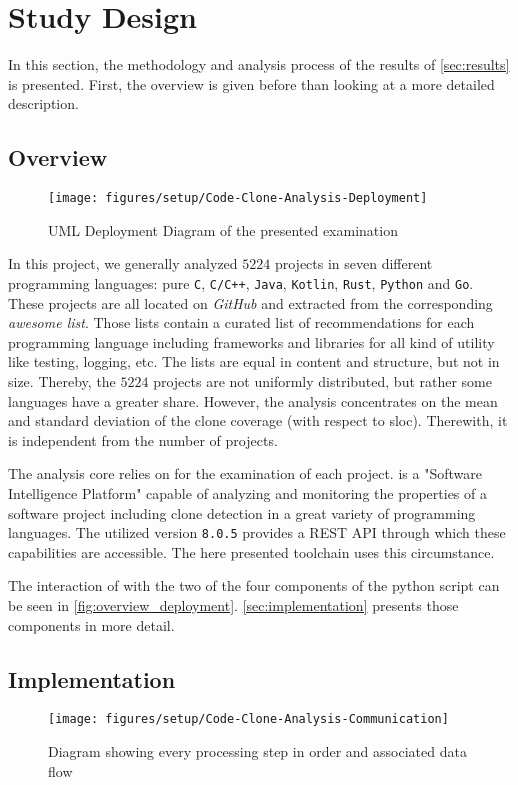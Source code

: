 
\section{Study Design}
\label{sec:study_design}

In this section, the methodology and analysis process of the results of \autoref{sec:results} is presented. First, the overview is given before than looking at a more detailed description.


\subsection{Overview}

\begin{figure}[htb]
	\centering
	\texttt{[image: figures/setup/Code-Clone-Analysis-Deployment]}
	\caption{UML Deployment Diagram of the presented examination}
	\label{fig:overview_deployment}
\end{figure}

In this project, we generally analyzed $5224$ projects in seven different programming languages: pure \texttt{C}, \texttt{C/C++}, \texttt{Java}, \texttt{Kotlin}, \texttt{Rust}, \texttt{Python} and \texttt{Go}. These projects are all located on \textit{GitHub} and extracted from the corresponding \textit{awesome list}\awesomeFootnote{}. Those lists contain a curated list of recommendations for each programming language including frameworks and libraries for all kind of utility like testing, logging, etc.
The lists are equal in content and structure, but not in size. Thereby, the $5224$ projects are not uniformly distributed, but rather some languages have a greater share. However, the analysis concentrates on the mean and standard deviation of the clone coverage (with respect to \ac{sloc}). Therewith, it is independent from the number of projects.

The analysis core relies on \teamscale{}\teamscaleFootnote{} for the examination of each project. \teamscale{} is a "Software Intelligence Platform" capable of analyzing and monitoring the properties of a software project including clone detection in a great variety of programming languages. The utilized version \texttt{8.0.5} provides a REST API through which these capabilities are accessible. The here presented toolchain uses this circumstance.

The interaction of \teamscale{} with the two of the four components of the python script can be seen in \autoref{fig:overview_deployment}. \autoref{sec:implementation} presents those components in more detail.

\subsection{Implementation}
\label{sec:implementation}

\begin{figure}[htb]
	\centering
	\texttt{[image: figures/setup/Code-Clone-Analysis-Communication]}
	\caption{Diagram showing every processing step in order and associated data flow}
	\label{fig:overview_communication}
\end{figure}